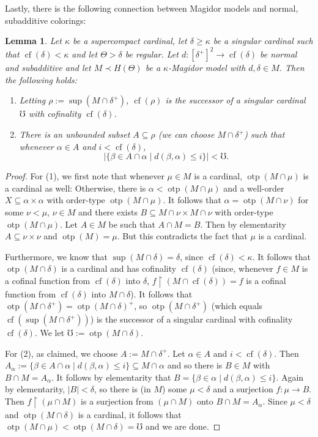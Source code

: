 \documentclass[a4paper]{amsart}
\theoremstyle{definition}
\theoremstyle{remark}
\theoremstyle{plain}
\newtheorem{mylem}[mydef]{Lemma}
\numberwithin{mydef}{section}
\DeclareMathOperator{\otp}{otp}
\DeclareMathOperator{\cf}{cf}
\newcommand{\uhr}{\upharpoonright}
\begin{document}
	Lastly, there is the following connection between Magidor models and normal, subadditive colorings:
	
	\begin{mylem}\label{InducedColoring}
		Let $\kappa$ be a supercompact cardinal, let $\delta\geq\kappa$ be a singular cardinal such that $\cf(\delta)<\kappa$ and let $\Theta>\delta$ be regular. Let $d\colon[\delta^+]^2\to\cf(\delta)$ be normal and subadditive and let $M\prec H(\Theta)$ be a $\kappa$-Magidor model with $d,\delta\in M$. Then the following holds:
		\begin{enumerate}
			\item Letting $\rho:=\sup(M\cap\delta^+)$, $\cf(\rho)$ is the successor of a singular cardinal $\mho$ with cofinality $\cf(\delta)$.
			\item There is an unbounded subset $A\subseteq\rho$ (we can choose $M\cap\delta^+$) such that whenever $\alpha\in A$ and $i<\cf(\delta)$,
			$$|\{\beta\in A\cap\alpha\;|\;d(\beta,\alpha)\leq i\}|<\mho.$$
		\end{enumerate}
	\end{mylem}
	
	\begin{proof}
		For (1), we first note that whenever $\mu\in M$ is a cardinal, $\otp(M\cap\mu)$ is a cardinal as well: Otherwise, there is $\alpha<\otp(M\cap\mu)$ and a well-order $X\subseteq\alpha\times\alpha$ with order-type $\otp(M\cap\mu)$. It follows that $\alpha=\otp(M\cap\nu)$ for some $\nu<\mu$, $\nu\in M$ and there exists $B\subseteq M\cap\nu\times M\cap\nu$ with order-type $\otp(M\cap\mu)$. Let $A\in M$ be such that $A\cap M=B$. Then by elementarity $A\subseteq\nu\times\nu$ and $\otp(M)=\mu$. But this contradicts the fact that $\mu$ is a cardinal.
		
		Furthermore, we know that $\sup(M\cap\delta)=\delta$, since $\cf(\delta)<\kappa$. It follows that $\otp(M\cap\delta)$ is a cardinal and has cofinality $\cf(\delta)$ (since, whenever $f\in M$ is a cofinal function from $\cf(\delta)$ into $\delta$, $f\uhr (M\cap\cf(\delta))=f$ is a cofinal function from $\cf(\delta)$ into $M\cap\delta$). It follows that $\otp(M\cap\delta^+)=\otp(M\cap\delta)^+$, so $\otp(M\cap\delta^+)$ (which equals $\cf(\sup(M\cap\delta^+))$) is the successor of a singular cardinal with cofinality $\cf(\delta)$. We let $\mho:=\otp(M\cap\delta)$.
		
		For (2), as claimed, we choose $A:=M\cap\delta^+$. Let $\alpha\in A$ and $i<\cf(\delta)$. Then $A_{\alpha}:=\{\beta\in A\cap\alpha\;|\;d(\beta,\alpha)\leq i\}\subseteq M\cap\alpha$ and so there is $B\in M$ with $B\cap M=A_{\alpha}$. It follows by elementarity that $B=\{\beta\in\alpha\;|\;d(\beta,\alpha)\leq i\}$. Again by elementarity, $|B|<\delta$, so there is (in $M$) some $\mu<\delta$ and a surjection $f\colon\mu\to B$. Then $f\uhr(\mu\cap M)$ is a surjection from $(\mu\cap M)$ onto $B\cap M=A_{\alpha}$. Since $\mu<\delta$ and $\otp(M\cap\delta)$ is a cardinal, it follows that $\otp(M\cap\mu)<\otp(M\cap\delta)=\mho$ and we are done.
	\end{proof}
	
\end{document}
